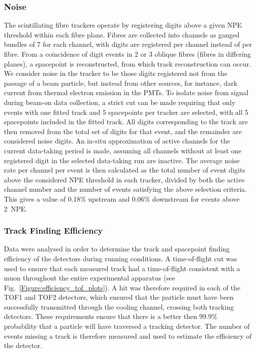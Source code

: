 \subsubsection{Noise}
The scintillating fibre trackers operate by registering digits above a given NPE threshold within each fibre plane. Fibres are collected into channels as ganged bundles of 7 for each channel, with digits are registered per channel instead of per fibre. From a coincidence of digit events in 2 or 3 oblique fibres (fibres in differing planes), a spacepoint is reconstructed, from which track reconstruction can occur. We consider noise in the tracker to be those digits registered not from the passage of a beam particle, but instead from other sources, for instance, dark current from thermal electron emission in the PMTs. To isolate noise from signal during beam-on data collection, a strict cut can be made requiring that only events with one fitted track and 5 spacepoints per tracker are selected, with all 5 spacepoints included in the fitted track. All digits corresponding to the track are then removed from the total set of digits for that event, and the remainder are considered noise digits. An in-situ approximation of active channels for the current data-taking period is made, assuming all channels without at least one registered digit in the selected data-taking run are inactive. The average noise rate per channel per event is then calculated as the total number of event digits above the considered NPE threshold in each tracker, divided by both the active channel number and the number of events satisfying the above selection criteria. This gives a value of 0.18\% upstream and 0.06\% downstream for events above 2~NPE. 

\subsubsection{Track Finding Efficiency}
\label{trackers:performance:efficiency}
Data were analysed in order to determine the track and spacepoint finding efficiency of the detectors during running conditions. A time-of-flight cut was used to ensure that each measured track had a time-of-flight consistent with a muon throughout the entire experimental apparatus (see Fig.~\ref{Figure:efficiency_tof_plots}). A hit was therefore required in each of the TOF1 and TOF2 detectors, which ensured that the particle must have been successfully transmitted through the cooling channel, crossing both tracking detectors. These requirements ensure that there is a better then 99.9\% probability that a particle will have traversed a tracking detector. The number of events missing a track is therefore measured and used to estimate the efficiency of the detector.

